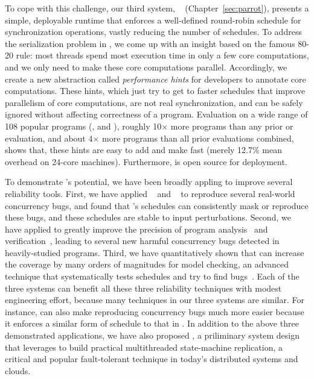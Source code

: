 To cope with this challenge, our third \smt system, \parrot~\cite{parrot:sosp13}
(Chapter~\ref{sec:parrot}), presents a simple, deployable runtime that enforces
a
well-defined round-robin schedule for synchronization operations, vastly
reducing the number of schedules. To address the serialization problem in \smt,
we come up with an insight based on the famous 80-20 rule: most threads spend
most execution time in only a few core computations, and we only need to make 
these core computations parallel. Accordingly, we create a new abstraction
called \emph{performance hints} for developers to annotate core computations.
These hints, which just try to get to faster schedules that improve parallelism
of core computations, are not real synchronization, and can be safely ignored
without affecting correctness of a program. Evaluation on a wide range of 108
popular programs (\eg, \bdb and \mplayer), roughly 10$\times$ more programs than
any prior \smt or \dmt evaluation, and about 4$\times$ more programs than all
prior evaluations combined, shows that, these hints are easy to add and make
\parrot fast (merely 12.7\% mean overhead on 24-core machines). Furthermore,
\parrot is open source for deployment.

To demonstrate \smt's potential, we have been broadly appling \smt to improve
several reliability tools. First, we have applied \tern~\cite{cui:tern:osdi10}
and \peregrine~\cite{peregrine:sosp11} to reproduce several real-world
concurrency bugs, and found that \smt's schedules can consistently mask or
reproduce these bugs, and these schedules are stable to input perturbations.
Second, we have applied \peregrine to greatly improve the precision of program
analysis~\cite{wu:pldi12} and verification~\cite{wu:pldi12}, leading to several
new harmful concurrency bugs detected in heavily-studied programs. Third, we
have quantitatively shown that \parrot can increase the coverage by many orders
of magnitudes for model checking, an advanced technique that systematically
tests schedules and try to find bugs~\cite{parrot:sosp13, dbug:spin11,
modist:nsdi09}. Each of the three systems can benefit all these three
reliability techniques with modest engineering effort, because many techniques
in our three \smt systems are similar. For instance, \parrot can also make
reproducing concurrency bugs much more easier because it enforces a similar form
of schedule to that in \tern. In addition to the above three demonstrated \smt
applications, we have also proposed \crane, a priliminary system design that
leverages \smt to build practical multithreaded state-machine replication, a
critical and popular fault-tolerant technique in today's distributed systems and
clouds.

